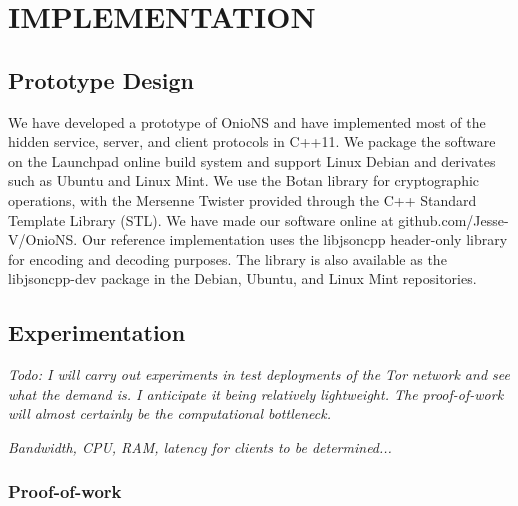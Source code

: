 
\chapter{IMPLEMENTATION}

\section{Prototype Design}

We have developed a prototype of OnioNS and have implemented most of the hidden service, server, and client protocols in C++11. We package the software on the Launchpad online build system and support Linux Debian and derivates such as Ubuntu and Linux Mint. We use the Botan library for cryptographic operations, with the Mersenne Twister provided through the C++ Standard Template Library (STL). We have made our software online at github.com/Jesse-V/OnioNS. Our reference implementation uses the libjsoncpp header-only library for encoding and decoding purposes. The library is also available as the libjsoncpp-dev package in the Debian, Ubuntu, and Linux Mint repositories.

\section{Experimentation}


\emph{Todo: I will carry out experiments in test deployments of the Tor network and see what the demand is. I anticipate it being relatively lightweight. The proof-of-work will almost certainly be the computational bottleneck.}

\emph{Bandwidth, CPU, RAM, latency for clients to be determined...}




\subsection{Proof-of-work}

